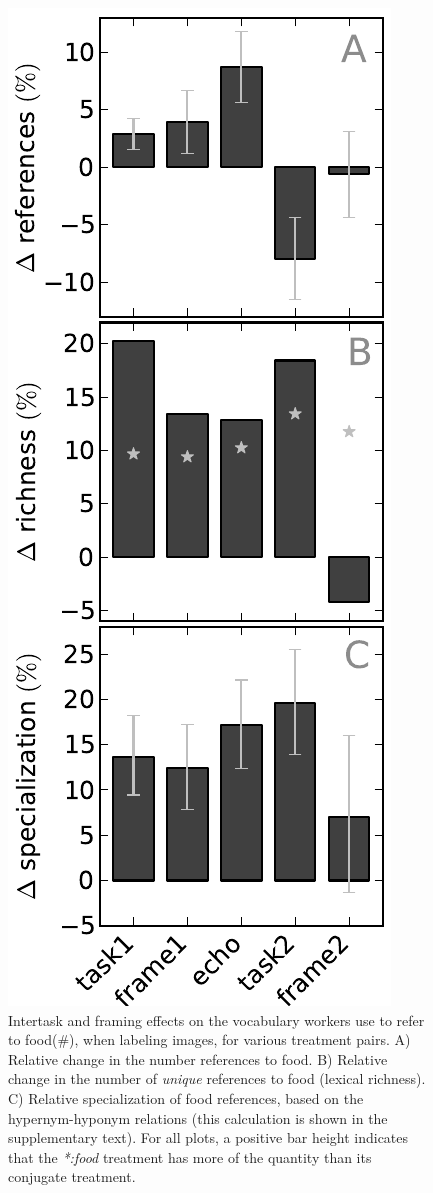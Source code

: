 \documentclass[12pt]{article}
\begin{document}
\begin{figure}
	\centering
	\includegraphics[scale=1]{figs/vocab_specificity.pdf}
	\caption{
		Intertask and framing effects on the vocabulary workers use to refer 
		to food(\#), when labeling images, for various treatment pairs.
		A) Relative change in the number references to food. 
		B) Relative change in the number of \textit{unique} 
		references to food (lexical richness). 
		C) Relative specialization of food references, based on the 
		hypernym-hyponym relations (this calculation is shown in the 
		supplementary text).  For all
		plots, a positive bar height indicates that the \textit{*:food}
		treatment has more of the quantity than its conjugate treatment.
	}
	\label{fig:specificity}
\end{figure}
\end{document}
